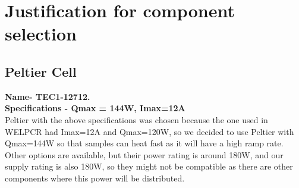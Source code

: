 \documentclass[12pt]{article}
\begin{document}
\section{Justification for component selection}
\subsection{Peltier Cell}
\textbf{Name- TEC1-12712.\\}
\textbf{Specifications - Qmax = 144W, Imax=12A} \\
Peltier with the above specifications was chosen because the one used in WELPCR had Imax=12A and Qmax=120W, so we decided to use Peltier with Qmax=144W so that samples can heat fast as it will have a high ramp rate. Other options are available, but their power rating is around 180W, and our supply rating is also 180W, so they might not be compatible as there are other components where this power will be distributed.
\end{document}
